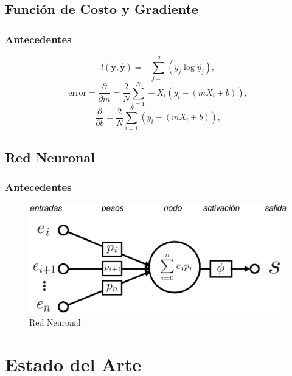 \documentclass{beamer}
\begin{document}
\subsection{Función de Costo y Gradiente}
\begin{frame}
\frametitle{Antecedentes}
    \begin{equation}
        l(\mathbf{y}, \hat{\mathbf{y}}) = - \sum_{j=1}^q (y_j \log \hat{y}_j),     
    \end{equation}
    \begin{equation}
        \text{error} = \frac{\partial}{\partial m} = \frac{2}{N}\sum_{i=1}^{N}-X_i(y_i-(mX_i+b)),
    \end{equation}
    \begin{equation}
            \frac{\partial}{\partial b} = \frac{2}{N}\sum_{i=1}^{N}(y_i-(mX_i+b)),
    \end{equation}
\end{frame}

\subsection{Red Neuronal}
\begin{frame}
    \frametitle{Antecedentes}
    \begin{figure}
        \centering
        \includegraphics[scale=0.3]{Figuras/neural_network.eps}
        \caption{Red Neuronal}    
    \end{figure}
\end{frame}

\section{Estado del Arte}
\end{document}
